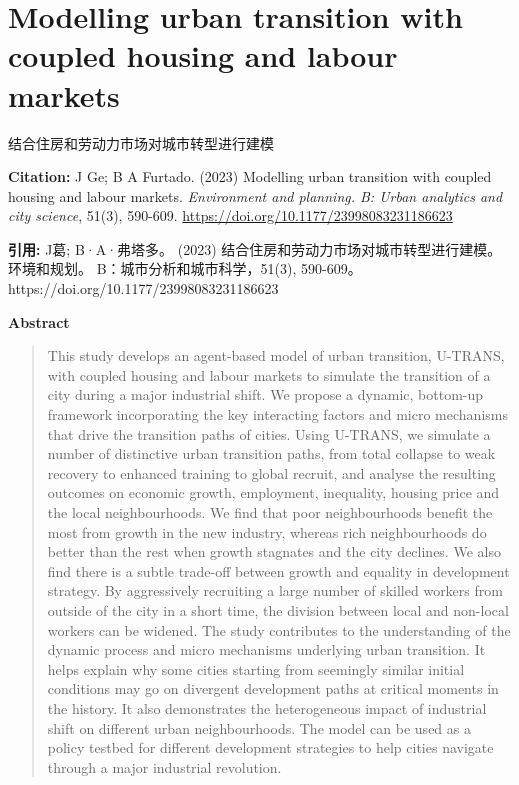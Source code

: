 \vspace{0.5em}


\chapter{Modelling urban transition with coupled housing and labour markets}
\begin{center}\small 结合住房和劳动力市场对城市转型进行建模\end{center}

\noindent\textbf{Citation:} J Ge; B A Furtado. (2023) Modelling urban transition with coupled housing and labour markets. \textit{Environment and planning. B: Urban analytics and city science}, 51(3), 590-609. \url{https://doi.org/10.1177/23998083231186623}

\vspace{0.5em}
\noindent\textbf{引用:} J葛; B·A·弗塔多。 (2023) 结合住房和劳动力市场对城市转型进行建模。环境和规划。 B：城市分析和城市科学，51(3), 590-609。 https://doi.org/10.1177/23998083231186623

\vspace{1.5em}
\noindent\textbf{Abstract}\par
\begin{quote}\small
This study develops an agent-based model of urban transition, U-TRANS, with coupled housing and labour markets to simulate the transition of a city during a major industrial shift. We propose a dynamic, bottom-up framework incorporating the key interacting factors and micro mechanisms that drive the transition paths of cities. Using U-TRANS, we simulate a number of distinctive urban transition paths, from total collapse to weak recovery to enhanced training to global recruit, and analyse the resulting outcomes on economic growth, employment, inequality, housing price and the local neighbourhoods. We find that poor neighbourhoods benefit the most from growth in the new industry, whereas rich neighbourhoods do better than the rest when growth stagnates and the city declines. We also find there is a subtle trade-off between growth and equality in development strategy. By aggressively recruiting a large number of skilled workers from outside of the city in a short time, the division between local and non-local workers can be widened. The study contributes to the understanding of the dynamic process and micro mechanisms underlying urban transition. It helps explain why some cities starting from seemingly similar initial conditions may go on divergent development paths at critical moments in the history. It also demonstrates the heterogeneous impact of industrial shift on different urban neighbourhoods. The model can be used as a policy testbed for different development strategies to help cities navigate through a major industrial revolution.
\end{quote}

